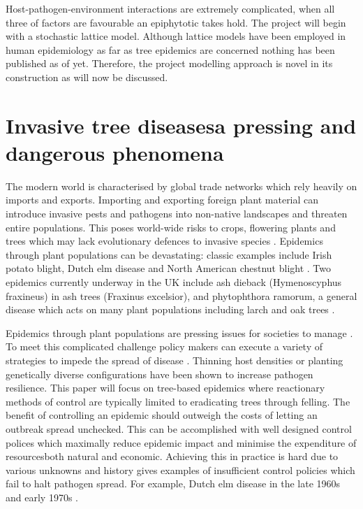 Host-pathogen-environment interactions are extremely complicated, when all three of factors are favourable an epiphytotic takes hold. The project will begin with a stochastic lattice model. Although lattice models have been employed in human epidemiology as far as tree epidemics are concerned nothing has  been published as of yet. Therefore, the project modelling approach is novel in its construction as will now be discussed.

\section{Invasive tree diseases\textemdash a pressing and dangerous phenomena}
The modern world is characterised by global trade networks which rely heavily on imports and exports. Importing and exporting foreign plant material can introduce invasive pests and pathogens into non-native landscapes and threaten entire populations. This poses world-wide risks to crops, flowering plants and trees which may lack evolutionary defences to invasive species \cite{doi:10.1002/9781444329988.ch8}. Epidemics through plant populations can be devastating: classic examples include Irish potato blight, Dutch elm disease \cite{doi:10.1111/j.1365-3059.2010.02391.x} and North American chestnut blight \cite{doi:10.1002/9780470535486.ch7}. Two epidemics currently underway in the UK include ash dieback (Hymenoscyphus fraxineus) in ash trees (Fraxinus excelsior),  \cite{ash-dieback-costs} and phytophthora ramorum, a general disease which acts on many plant populations including larch and oak trees \cite{p.ramourum}.

Epidemics through plant populations are pressing issues for societies to manage \cite{pests-intro}. To meet this complicated challenge policy makers can execute a variety of strategies to impede the spread of disease \cite{Gilligan-disease-management}. Thinning host densities \cite{resiliency-density-reductions} or planting genetically diverse configurations \cite{burdon1982host, huang1980importance, doi:10.1094/PD-89-0969, genetic-heterogeneity} have been shown to increase pathogen resilience. This paper will focus on tree-based epidemics where reactionary methods of control are typically limited to eradicating trees through felling.
The benefit of controlling an epidemic should outweigh the costs of letting an outbreak spread unchecked. This can be accomplished with well designed control polices which maximally reduce epidemic impact and minimise the expenditure of resources\textemdash both natural and economic. Achieving this in practice is hard due to various unknowns \cite{13-challenges} and history gives examples of insufficient control policies which fail to halt pathogen spread. For example, Dutch elm disease in the late 1960s and early 1970s \cite{dutch-elm-mismanage}. 

